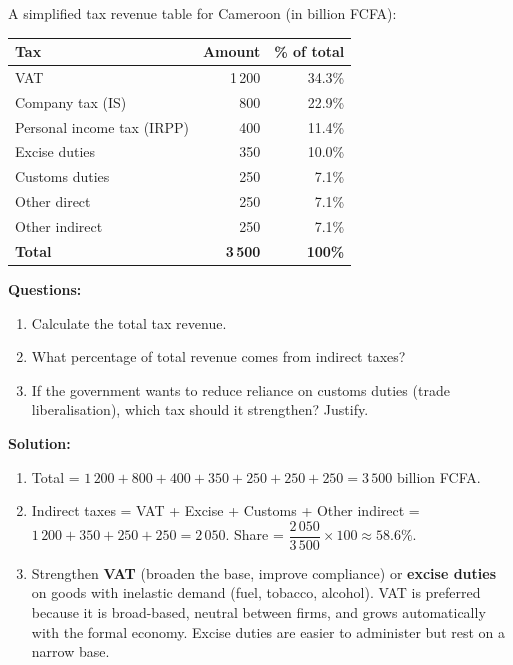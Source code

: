 \documentclass[11pt]{article}
\begin{document}
\begin{exoresolu}
A simplified tax revenue table for Cameroon (in billion FCFA):

\begin{center}
\begin{tabular}{|l|r|r|}
\hline
\rowcolor{popblueL}
\textbf{Tax} & \textbf{Amount} & \textbf{\% of total} \\
\hline
VAT & 1\,200 & 34.3\% \\
\hline
Company tax (IS) & 800 & 22.9\% \\
\hline
Personal income tax (IRPP) & 400 & 11.4\% \\
\hline
Excise duties & 350 & 10.0\% \\
\hline
Customs duties & 250 & 7.1\% \\
\hline
Other direct & 250 & 7.1\% \\
\hline
Other indirect & 250 & 7.1\% \\
\hline
\textbf{Total} & \textbf{3\,500} & \textbf{100\%} \\
\hline
\end{tabular}
\end{center}

\textbf{Questions:}
\begin{enumerate}
    \item Calculate the total tax revenue.
    \item What percentage of total revenue comes from indirect taxes?
    \item If the government wants to reduce reliance on customs duties (trade liberalisation), which tax should it strengthen? Justify.
\end{enumerate}
\tcblower
\textbf{Solution:}
\begin{enumerate}
    \item Total = $1\,200 + 800 + 400 + 350 + 250 + 250 + 250 = 3\,500$ billion FCFA.
    \item Indirect taxes = VAT + Excise + Customs + Other indirect = $1\,200 + 350 + 250 + 250 = 2\,050$. Share = $\dfrac{2\,050}{3\,500} \times 100 \approx 58.6\%$.
    \item Strengthen \textbf{VAT} (broaden the base, improve compliance) or \textbf{excise duties} on goods with inelastic demand (fuel, tobacco, alcohol). VAT is preferred because it is broad-based, neutral between firms, and grows automatically with the formal economy. Excise duties are easier to administer but rest on a narrow base.
\end{enumerate}
\end{exoresolu}
\end{document}
